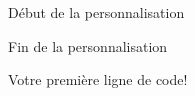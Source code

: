 \documentclass[10.5pt,a4paper]{article}
\begin{document}
\begin{figure}[H]
  \centering
  \caption{Début de la personnalisation}
  \label{rstudio2}
\end{figure}

\begin{figure}[H]
  \centering
  \caption{Fin de la personnalisation}
  \label{rstudio3}
\end{figure}

\begin{figure}[H]
  \centering
  \caption{Votre première ligne de code!}
  \label{rstudio4}
\end{figure}
\end{document}
